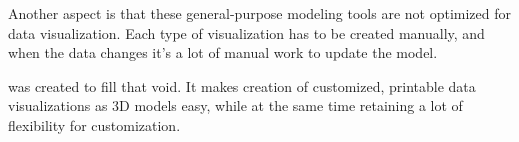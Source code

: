 Another aspect is that these general-purpose modeling tools are not optimized
for data visualization. Each type of visualization has to be created manually,
and when the data changes it's a lot of manual work to update the model.

\tangible{} was created to fill that void. It makes creation of customized,
printable data visualizations as 3D models easy, while at the same time
retaining a lot of flexibility for customization.

